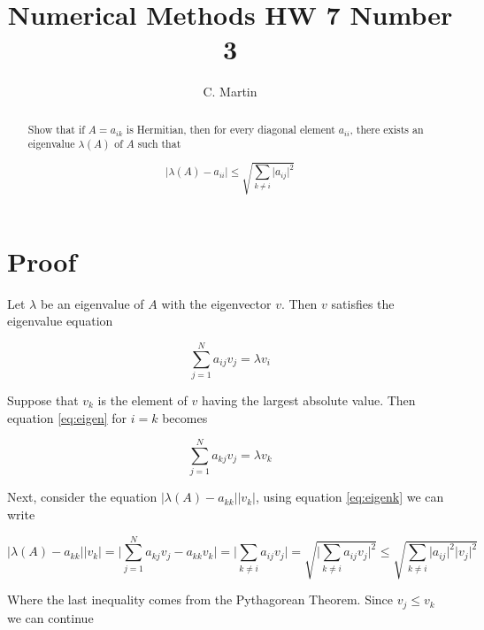 \documentclass[aps,prl,groupedaddress]{revtex4}
\begin{document}
\title{Numerical Methods HW 7 Number 3}

\author{C. Martin}

\begin{abstract}
Show that if $A = a_{ik}$ is Hermitian, then for every diagonal element $a_{ii}$, there exists an eigenvalue $\lambda(A)$ of $A$ such that

\begin{equation}
\label{eq:prob}
\lvert \lambda (A) - a_{ii} \rvert \leq \sqrt{\sum_{k \neq i} \lvert a_{ij} \rvert^{2}}
\end{equation}

\end{abstract}

\maketitle
\section{Proof}
Let $\lambda$ be an eigenvalue of $A$ with the eigenvector $v$. Then $v$ satisfies the eigenvalue equation

\begin{equation}
\label{eq:eigen}
\sum_{j=1}^{N} a_{ij} v_{j} = \lambda v_{i}
\end{equation}

Suppose that $v_{k}$ is the element of $v$ having the largest absolute value. Then equation \ref{eq:eigen} for $i=k$ becomes

\begin{equation}
\label{eq:eigenk}
\sum_{j=1}^{N} a_{kj} v_{j} = \lambda v_{k}
\end{equation}


Next, consider the equation $\lvert \lambda (A) - a_{kk} \rvert \lvert v_{k} \rvert$, using equation \ref{eq:eigenk} we can write

\begin{equation}
\label{eq:abs}
\lvert \lambda (A) - a_{kk} \rvert \lvert v_{k} \rvert = \lvert \sum_{j=1}^{N} a_{kj} v_{j} - a_{kk}v_{k} \rvert = \lvert \sum_{k \neq i} a_{ij} v_{j}\rvert = \sqrt{\lvert \sum_{k \neq i} a_{ij} v_{j}\rvert^2} \leq \sqrt{\sum_{k \neq i} \lvert a_{ij} \rvert^2 \lvert v_{j} \rvert^2}
\end{equation}

Where the last inequality comes from the Pythagorean Theorem.  Since $v_{j} \leq v_{k}$ we can continue
\end{document}
